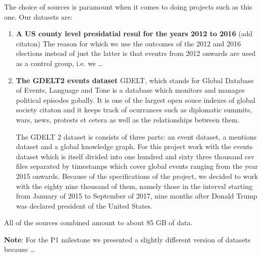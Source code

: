 The choice of sources is paramount when it comes to doing projects
such as this one. Our datasets are:
\begin{enumerate}
	\item \textbf{A US county level presidatial resul for the
		years 2012 to 2016}
		{\color{red}(add citaton)}
		The reason for which we use the outcomes
		of the 2012 and 2016 elections instead of just the latter
		is that eventrs from 2012 onwards are used as a
		control group, i.e. we \ldots

	\item \textbf{The GDELT2 events dataset}
		GDELT, which stands for Global Database of Events, Language
		and Tone is a database which monitors and manages
		political episodes gobally. It is one of the largest
		open souce indexes of global society {\color{red} citaton}
		and it keeps track of ocurrances
		such as diplomatic summits, wars, news, protests et
		cetera as well as the relationships between them.


		The GDELT 2 dataset is consists of three parts: an
		event dataset, a mentions dataset and a global knowledge
		graph. For this project work with the events dataset
		which is itself divided into one hundred and sixty three
		thousand csv files separated by timestamps which cover
		global events ranging from the year 2015 onwards.
		Because of the specifications of the project, we decided
		to work with the eighty nine thousand of them, namely
		those in the interval starting from January of 2015 to
		September of 2017, nine months after Donald Trump
		was declared president of the United States.

\end{enumerate}
All of the sources combined amount to about 85 GB of data.

\textbf{Note}: For the P1 milestone we presented a slightly
different version of datasets because \ldots
